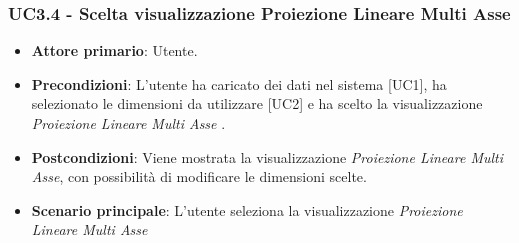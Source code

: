 \subsubsection{UC3.4 - Scelta visualizzazione Proiezione Lineare Multi Asse}

\begin{itemize}
	\item \textbf{Attore primario}: Utente.
	\item \textbf{Precondizioni}: L'utente ha caricato dei dati nel sistema [UC1], ha selezionato le dimensioni da utilizzare [UC2] e ha scelto la visualizzazione \textit{Proiezione Lineare Multi Asse} .
	\item \textbf{Postcondizioni}: Viene mostrata la visualizzazione \textit{Proiezione Lineare Multi Asse}, con possibilità di modificare le dimensioni scelte.
	\item \textbf{Scenario principale}: L'utente seleziona la visualizzazione \textit{Proiezione Lineare Multi Asse}
\end{itemize}